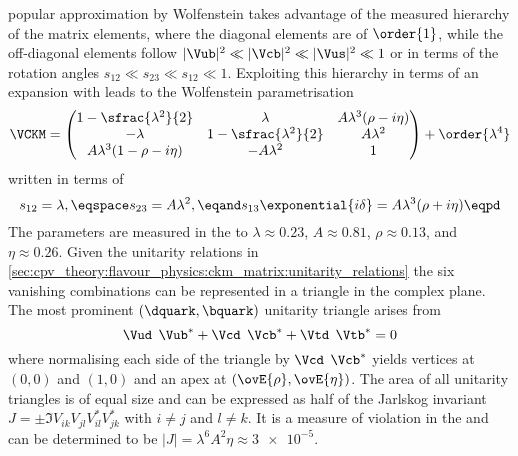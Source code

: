 popular approximation by Wolfenstein \cite{Wolfenstein:1983yz} takes advantage
of the measured hierarchy of the matrix elements, where the diagonal elements
are of $\order{1}$, while the off-diagonal elements follow $\vert\Vub\vert^2 \ll
\vert\Vcb\vert^2 \ll \vert\Vus\vert^2 \ll 1$ or in terms of the rotation angles
$s_{12} \ll s_{23} \ll s_{12} \ll 1$. Exploiting this hierarchy in terms of an
expansion with leads to the Wolfenstein parametrisation
%
\begin{equation}  
  \VCKM = \begin{pmatrix}
    1 - \sfrac{\lambda^2}{2}        & \lambda                     & A \lambda^3 (\rho - i\eta)  \\
    -\lambda                        & 1 - \sfrac{\lambda^2}{2}    & A \lambda^2                 \\
    A \lambda^3 (1 - \rho - i\eta)  & - A \lambda^2               & 1                           \\
  \end{pmatrix}
  + \order{\lambda^4}
\end{equation}
%
written in terms of
%
\begin{equation}
  s_{12} = \lambda, \eqspace s_{23} = A \lambda^2, \eqand s_{13}\exponential{i\delta} = A \lambda^3 (\rho + i \eta) \eqpd
\end{equation}
%
The parameters are measured in the \SM to $\lambda \approx 0.23$, $A \approx
0.81$, $\rho \approx 0.13$, and $\eta \approx 0.26$. Given the unitarity
relations in
\cref{sec:cpv_theory:flavour_physics:ckm_matrix:unitarity_relations} the six
vanishing combinations can be represented in a triangle in the complex plane.
The most prominent ${(\dquark,\bquark)}$ unitarity triangle arises from
%
\begin{equation}
  \Vud^{\phantom{\ast}}\Vub^{\ast} + \Vcd^{\phantom{\ast}}\Vcb^{\ast} + \Vtd^{\phantom{\ast}}\Vtb^{\ast} = 0 
\end{equation}
%
where normalising each side of the triangle by
$\Vcd^{\phantom{\ast}}\Vcb^{\ast}$ yields vertices at ${(0,0)}$ and ${(1,0)}$
and an apex at ${(\ovE{\rho},\ovE{\eta})}$. The area of all unitarity triangles
is of equal size and can be expressed as half of the Jarlskog invariant $J = \pm
\Im V_{ik}^{\phantom{\ast}} V_{jl}^{\phantom{\ast}} V_{il}^{\ast} V_{jk}^{\ast}$
with $i \neq j$ and $l \neq k$. It is a measure of \CP violation in the \SM and
can be determined to be $\vert J \vert = \lambda^6 A^2 \eta \approx \num{3e-5}$.


